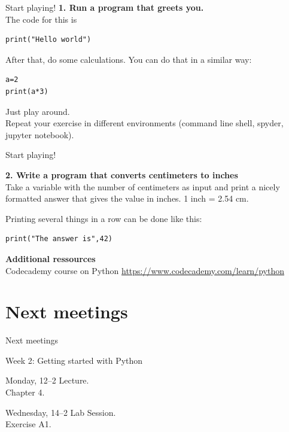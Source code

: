 \documentclass{beamer}
\begin{document}
\begin{frame}[fragile]{Start playing!}
\textbf{1. Run a program that greets you.}\\
The code for this is 
\begin{lstlisting}
print("Hello world")
\end{lstlisting}
After that, do some calculations. You can do that in a similar way:
\begin{lstlisting}
a=2
print(a*3)
\end{lstlisting}
Just play around. \\ 
Repeat your exercise in different environments (command line shell, spyder, jupyter notebook).


\end{frame}



\begin{frame}[fragile]{Start playing!}

	\textbf{2. Write a program that converts centimeters to inches}\\

	Take a variable with the number of centimeters as input and print a nicely formatted answer that gives the value in inches. 1 inch = 2.54 cm.

	Printing several things in a row can be done like this:
\begin{lstlisting}
print("The answer is",42)
\end{lstlisting}	
	
	\vspace{.5cm}
	\textbf{Additional ressources}\\
	Codecademy course on Python
	\url{https://www.codecademy.com/learn/python}
	
\end{frame}



\section{Next meetings}
\begin{frame}{}
Next meetings
\end{frame}


\begin{frame}{Week 2: Getting started with Python}

\begin{block}{Monday, 12--2}
Lecture.
\\Chapter 4.
\end{block}


\begin{block}{Wednesday, 14--2}
Lab Session.
\\ Exercise A1.
\end{block}



\end{frame}
\end{document}
